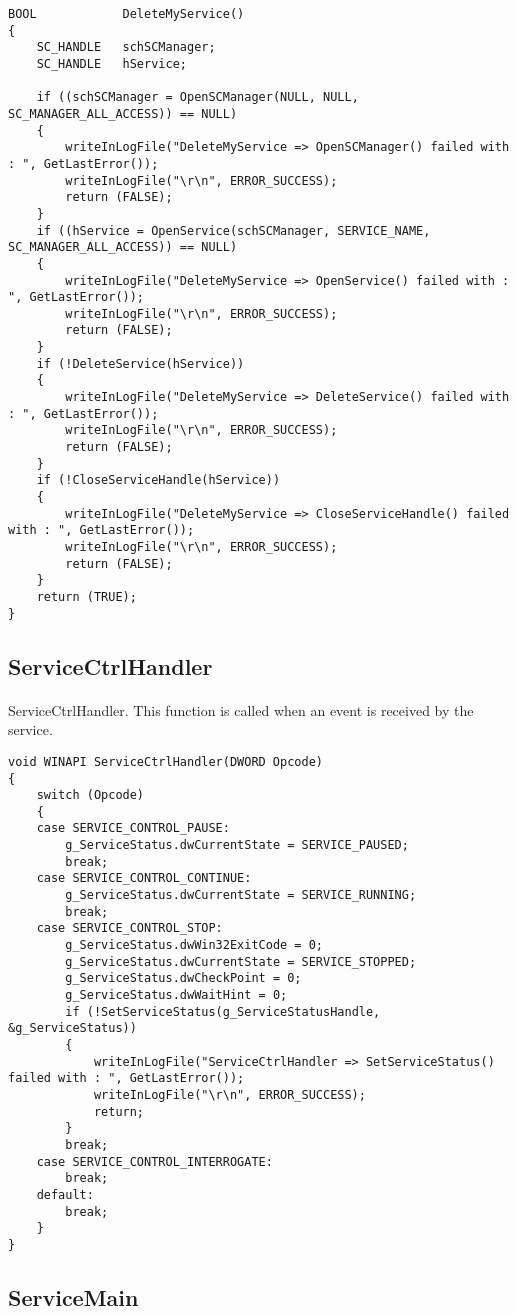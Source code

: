 \documentclass{article}
\begin{document}
\begin{lstlisting}
BOOL			DeleteMyService()
{
	SC_HANDLE	schSCManager;
	SC_HANDLE	hService;

	if ((schSCManager = OpenSCManager(NULL, NULL, SC_MANAGER_ALL_ACCESS)) == NULL)
	{
		writeInLogFile("DeleteMyService => OpenSCManager() failed with : ", GetLastError());
		writeInLogFile("\r\n", ERROR_SUCCESS);
		return (FALSE);
	}
	if ((hService = OpenService(schSCManager, SERVICE_NAME, SC_MANAGER_ALL_ACCESS)) == NULL)
	{
		writeInLogFile("DeleteMyService => OpenService() failed with : ", GetLastError());
		writeInLogFile("\r\n", ERROR_SUCCESS);
		return (FALSE);
	}
	if (!DeleteService(hService))
	{
		writeInLogFile("DeleteMyService => DeleteService() failed with : ", GetLastError());
		writeInLogFile("\r\n", ERROR_SUCCESS);
		return (FALSE);
	}
	if (!CloseServiceHandle(hService))
	{
		writeInLogFile("DeleteMyService => CloseServiceHandle() failed with : ", GetLastError());
		writeInLogFile("\r\n", ERROR_SUCCESS);
		return (FALSE);
	}
	return (TRUE);
}
\end{lstlisting}

\newpage
\subsection{ServiceCtrlHandler}
\paragraph{}
ServiceCtrlHandler. This function is called when an event is received by the service.

\begin{lstlisting}
void WINAPI ServiceCtrlHandler(DWORD Opcode)
{
	switch (Opcode)
	{
	case SERVICE_CONTROL_PAUSE:
		g_ServiceStatus.dwCurrentState = SERVICE_PAUSED;
		break;
	case SERVICE_CONTROL_CONTINUE:
		g_ServiceStatus.dwCurrentState = SERVICE_RUNNING;
		break;
	case SERVICE_CONTROL_STOP:
		g_ServiceStatus.dwWin32ExitCode = 0;
		g_ServiceStatus.dwCurrentState = SERVICE_STOPPED;
		g_ServiceStatus.dwCheckPoint = 0;
		g_ServiceStatus.dwWaitHint = 0;
		if (!SetServiceStatus(g_ServiceStatusHandle, &g_ServiceStatus))
		{
			writeInLogFile("ServiceCtrlHandler => SetServiceStatus() failed with : ", GetLastError());
			writeInLogFile("\r\n", ERROR_SUCCESS);
			return;
		}
		break;
	case SERVICE_CONTROL_INTERROGATE:
		break;
	default:
		break;
	}
}
\end{lstlisting}

\newpage
\subsection{ServiceMain}
\end{document}
